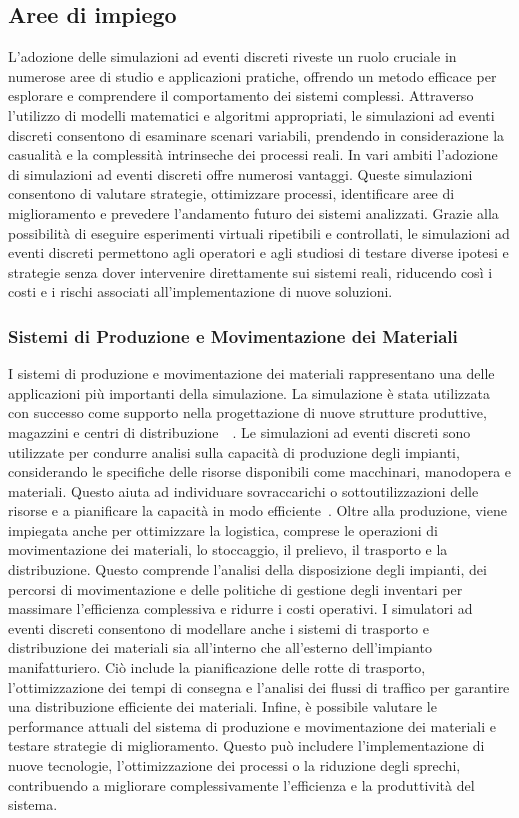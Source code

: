 \documentclass[12pt,a4paper,openright,twoside]{book}
\begin{document}
\subsection{Aree di impiego}
L'adozione delle simulazioni ad eventi discreti riveste un ruolo cruciale in numerose aree di studio e applicazioni pratiche, offrendo un metodo efficace per esplorare e comprendere il comportamento dei sistemi complessi. Attraverso l'utilizzo di modelli matematici e algoritmi appropriati, le simulazioni ad eventi discreti consentono di esaminare scenari variabili, prendendo in considerazione la casualità e la complessità intrinseche dei processi reali.
In vari ambiti l'adozione di simulazioni ad eventi discreti offre numerosi vantaggi. Queste simulazioni consentono di valutare strategie, ottimizzare processi, identificare aree di miglioramento e prevedere l'andamento futuro dei sistemi analizzati. Grazie alla possibilità di eseguire esperimenti virtuali ripetibili e controllati, le simulazioni ad eventi discreti permettono agli operatori e agli studiosi di testare diverse ipotesi e strategie senza dover intervenire direttamente sui sistemi reali, riducendo così i costi e i rischi associati all'implementazione di nuove soluzioni.

\subsubsection{Sistemi di Produzione e Movimentazione dei Materiali}
I sistemi di produzione e movimentazione dei materiali rappresentano una delle applicazioni più importanti della simulazione. La simulazione è stata utilizzata con successo come supporto nella progettazione di nuove strutture produttive, magazzini e centri di distribuzione~\cite{KENDALL1998711}~\cite{Ingemansson2002ASO}.
Le simulazioni ad eventi discreti sono utilizzate per condurre analisi sulla capacità di produzione degli impianti, considerando le specifiche delle risorse disponibili come macchinari, manodopera e materiali. Questo aiuta ad individuare sovraccarichi o sottoutilizzazioni delle risorse e a pianificare la capacità in modo efficiente~\cite{sunmanufacturing}. 
Oltre alla produzione, viene impiegata anche per ottimizzare la logistica, comprese le operazioni di movimentazione dei materiali, lo stoccaggio, il prelievo, il trasporto e la distribuzione. Questo comprende l'analisi della disposizione degli impianti, dei percorsi di movimentazione e delle politiche di gestione degli inventari per massimare l'efficienza complessiva e ridurre i costi operativi. 
I simulatori ad eventi discreti consentono di modellare anche i sistemi di trasporto e distribuzione dei materiali sia all'interno che all'esterno dell'impianto manifatturiero. Ciò include la pianificazione delle rotte di trasporto, l'ottimizzazione dei tempi di consegna e l'analisi dei flussi di traffico per garantire una distribuzione efficiente dei materiali.
Infine, è possibile valutare le performance attuali del sistema di produzione e movimentazione dei materiali e testare strategie di miglioramento. Questo può includere l'implementazione di nuove tecnologie, l'ottimizzazione dei processi o la riduzione degli sprechi, contribuendo a migliorare complessivamente l'efficienza e la produttività del sistema.
\end{document}
